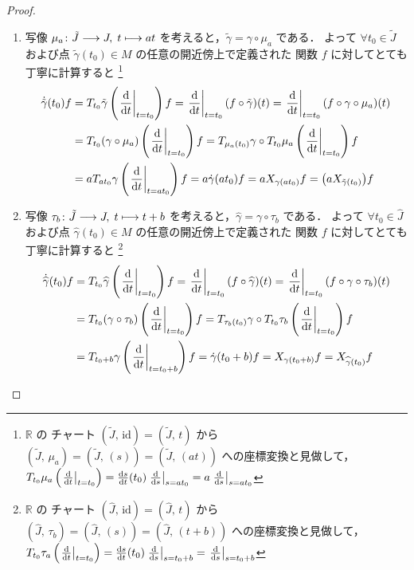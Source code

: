 \documentclass[geometry_main]{subfiles}
\begin{document}
\begin{proof}
    \begin{enumerate}
        \item \cinfty 写像 $\mu_a \colon \tilde{J} \longrightarrow J,\; t \longmapsto at$ を考えると，$\tilde{\gamma} = \gamma \circ \mu_a$ である．
        よって $\forall t_0 \in \tilde{J}$ および点 $\tilde{\gamma}(t_0) \in M$ の任意の開近傍上で定義された \cinfty 関数 $f$ に対してとても丁寧に計算すると
        \footnote{
            $\mathbb{R}$ の チャート $(\tilde{J},\, \mathrm{id}) = (\tilde{J},\, t)$ から $(\tilde{J},\, \mu_a) = (\tilde{J},\, (s)) = (\tilde{J},\, (at))$ への座標変換と見做して，$T_{t_0} \mu_a \left( \eval{\dv{}{t}}_{t=t_0} \right) = \dv{s}{t}()(t_0) \eval{\dv{}{s}}_{s=at_0} = a \eval{\dv{}{s}}_{s=at_0}$
        }
        \begin{align}
            \dot{\tilde{\gamma}}(t_0) f
            &= T_{t_0} \tilde{\gamma} \left( \eval{\dv{{t}}}_{t=t_0} \right) f
            = \eval{\dv{{t}}}_{t=t_0} (f \circ \tilde{\gamma})(t)
            = \eval{\dv{{t}}}_{t=t_0} (f \circ \gamma \circ \mu_a)(t) \\
            &= T_{t_0} (\gamma \circ \mu_a) \left( \eval{\dv{{t}}}_{t=t_0} \right) f
            = T_{\mu_a(t_0)} \gamma \circ T_{t_0} \mu_a \left( \eval{\dv{}{t}}_{t=t_0} \right) f \\
            &= aT_{at_0} \gamma  \left( \eval{\dv{}{t}}_{t=at_0} \right) f
            = a \dot{\gamma}(at_0) f
            = a X_{\gamma(at_0)} f
            = \bigl(a X_{\tilde{\gamma}(t_0)}\bigr) f
        \end{align}
        \item \cinfty 写像 $\tau_b \colon \tilde{J} \longrightarrow J,\; t \longmapsto t+b$ を考えると，$\widehat{\gamma} = \gamma \circ \tau_b$ である．
        よって $\forall t_0 \in \widehat{J}$ および点 $\widehat{\gamma}(t_0) \in M$ の任意の開近傍上で定義された \cinfty 関数 $f$ に対してとても丁寧に計算すると
        \footnote{
            $\mathbb{R}$ の チャート $(\widehat{J},\, \mathrm{id}) = (\widehat{J},\, t)$ から $(\widehat{J},\, \tau_b) = (\widehat{J},\, (s)) = (\widehat{J},\, (t+b))$ への座標変換と見做して，$T_{t_0} \tau_a \left( \eval{\dv{}{t}}_{t=t_0} \right) = \dv{s}{t}()(t_0) \eval{\dv{}{s}}_{s=t_0 + b} = \eval{\dv{}{s}}_{s=t_0+b}$
        }
        \begin{align}
            \dot{\widehat{\gamma}}(t_0) f
            &= T_{t_0} \widehat{\gamma} \left( \eval{\dv{{t}}}_{t=t_0} \right) f
            = \eval{\dv{{t}}}_{t=t_0} (f \circ \widehat{\gamma})(t)
            = \eval{\dv{{t}}}_{t=t_0} (f \circ \gamma \circ \tau_b)(t) \\
            &= T_{t_0} (\gamma \circ \tau_b) \left( \eval{\dv{{t}}}_{t=t_0} \right) f
            = T_{\tau_b(t_0)} \gamma \circ T_{t_0} \tau_b \left( \eval{\dv{}{t}}_{t=t_0} \right) f\\
            &= T_{t_0 + b} \gamma  \left( \eval{\dv{}{t}}_{t=t_0 + b} \right) f
            = \dot{\gamma}(t_0 + b) f
            = X_{\gamma(t_0 + b)} f 
            = X_{\widehat{\gamma}(t_0)} f
        \end{align}
    \end{enumerate}
    
\end{proof}
\end{document}
